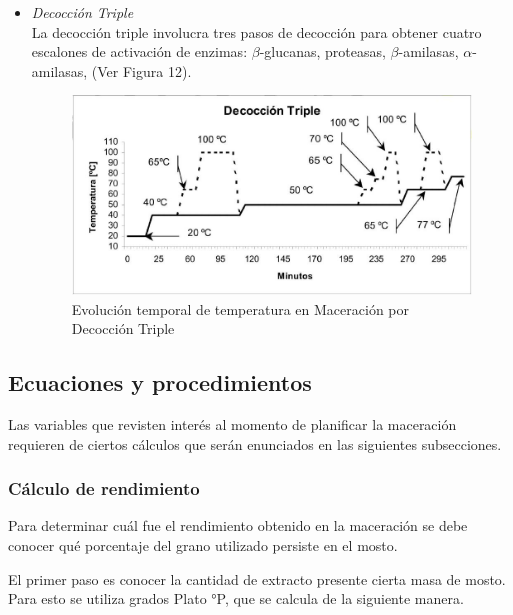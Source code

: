 \begin{itemize}
                    \item \textit{Decocción Triple} \\ La decocción triple involucra tres pasos de decocción para obtener cuatro escalones de activación de enzimas: $\beta$-glucanas, proteasas, $\beta$-amilasas, $\alpha$-amilasas, (Ver Figura 12).
                    
                        \begin{figure} [H]		                                                            \centerline{\includegraphics[scale=0.5]{decoccion_triple.jpg}}
                        \caption{Evolución temporal de temperatura en Maceración por Decocción Triple}
                        \label{MaceracionDecoccionTriple}
                        \end{figure}
                    
                \end{itemize}
        \subsection{Ecuaciones y procedimientos}
            \par Las variables que revisten interés al momento de planificar la maceración requieren de ciertos cálculos que serán enunciados en las siguientes subsecciones. 
            
            \subsubsection{Cálculo de rendimiento }
                \par Para determinar cuál fue el rendimiento obtenido en la maceración se debe conocer qué porcentaje del grano utilizado persiste en el mosto.
                
                \par El primer paso es conocer la cantidad de extracto presente cierta masa de mosto. Para esto se utiliza grados Plato °P, que se calcula de la siguiente manera.
                
